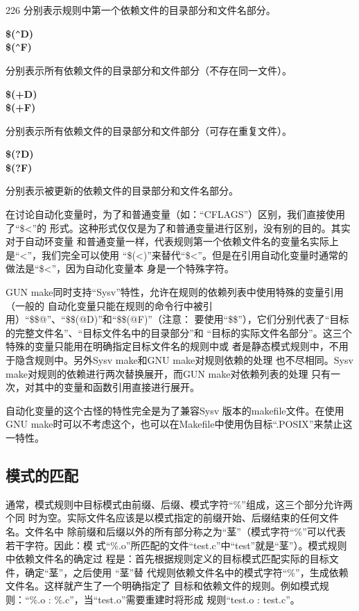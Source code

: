 \begin{dinglist}{226}
分别表示规则中第一个依赖文件的目录部分和文件名部分。

  \item \begin{minipage}[t]{\linewidth}
          \textbf{\$(}\verb"^"\textbf{D)} \\
          \textbf{\$(}\verb"^"\textbf{F)}
        \end{minipage}

分别表示所有依赖文件的目录部分和文件部分（不存在同一文件）。

  \item \begin{minipage}[t]{\linewidth}
          \textbf{\$(+D)} \\
          \textbf{\$(+F)}
        \end{minipage}

分别表示所有依赖文件的目录部分和文件部分（可存在重复文件）。

  \item \begin{minipage}[t]{\linewidth}
          \textbf{\$(?D)} \\
          \textbf{\$(?F)}
        \end{minipage}

分别表示被更新的依赖文件的目录部分和文件名部分。

\end{dinglist}

在讨论自动化变量时，为了和普通变量（如：“CFLAGS”）区别，我们直接使用了“\$<”的
形式。这种形式仅仅是为了和普通变量进行区别，没有别的目的。其实对于自动环变量
和普通变量一样，代表规则第一个依赖文件名的变量名实际上是“<”，我们完全可以使用
“\$(<)”来替代“\$<”。但是在引用自动化变量时通常的做法是“\$<”，因为自动化变量本
身是一个特殊字符。

GUN make同时支持“Sysv”特性，允许在规则的依赖列表中使用特殊的变量引用（一般的
自动化变量只能在规则的命令行中被引用）“\$\$@”、“\$\$(@D)”和“\$\$(@F)”（注意：
要使用“\$\$”），它们分别代表了“目标的完整文件名”、“目标文件名中的目录部分”和
“目标的实际文件名部分”。这三个特殊的变量只能用在明确指定目标文件名的规则中或
者是静态模式规则中，不用于隐含规则中。另外Sysv make和GNU make对规则依赖的处理
也不尽相同。Sysv make对规则的依赖进行两次替换展开，而GUN make对依赖列表的处理
只有一次，对其中的变量和函数引用直接进行展开。

自动化变量的这个古怪的特性完全是为了兼容Sysv 版本的makefile文件。在使用GNU
make时可以不考虑这个，也可以在Makefile中使用伪目标“.POSIX”来禁止这一特性。

\subsection{模式的匹配}
通常，模式规则中目标模式由前缀、后缀、模式字符“\%”组成，这三个部分允许两个同
时为空。实际文件名应该是以模式指定的前缀开始、后缀结束的任何文件名。文件名中
除前缀和后缀以外的所有部分称之为“茎”（模式字符“\%”可以代表若干字符。因此：模
式“\%.o”所匹配的文件“test.c”中“test”就是“茎”）。模式规则中依赖文件名的确定过
程是：首先根据规则定义的目标模式匹配实际的目标文件，确定“茎”，之后使用 “茎”替
代规则依赖文件名中的模式字符“\%”，生成依赖文件名。这样就产生了一个明确指定了
目标和依赖文件的规则。例如模式规则：“\%.o : \%.c”，当“test.o”需要重建时将形成
规则“test.o : test.c”。


